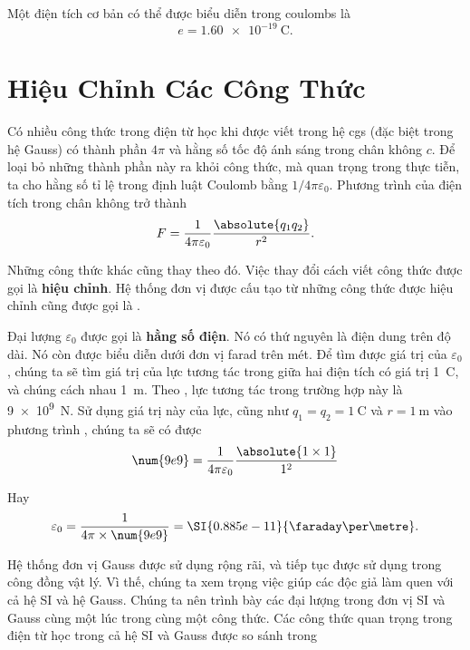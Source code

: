 Một điện tích cơ bản có thể được biểu diễn trong coulombs là
\begin{equation}\label{eq:1_10}
	e = \SI{1.60e-19}{\coulomb}.
\end{equation}

\section{Hiệu Chỉnh Các Công Thức}\label{sec:1_4}

Có nhiều công thức trong điện từ học khi được viết trong hệ cgs (đặc biệt trong hệ Gauss) có thành phần $4\pi$ và hằng số tốc độ ánh sáng trong chân không $c$. Để loại bỏ những thành phần này ra khỏi công thức, mà quan trọng trong thực tiễn, ta cho hằng số tỉ lệ trong định luật Coulomb bằng $1/4\pi\varepsilon_0$. Phương trình của điện tích trong chân không trở thành
\begin{equation}\label{eq:1_11}
	F = \frac{1}{4\pi\varepsilon_0}\frac{\absolute{q_1 q_2}}{r^2}.
\end{equation}

\noindent
Những công thức khác cũng thay theo đó. Việc thay đổi cách viết công thức được gọi là \textbf{hiệu chỉnh}. Hệ thống đơn vị được cấu tạo từ những công thức được hiệu chỉnh cũng được gọi là .

Đại lượng $\varepsilon_0$ được gọi là \textbf{hằng số điện}. Nó có thứ nguyên là điện dung trên độ dài. Nó còn được biểu diễn dưới đơn vị farad trên mét. Để tìm được giá trị của $\varepsilon_0$, chúng ta sẽ tìm giá trị của lực tương tác trong  giữa hai điện tích có giá trị \SI{1}{\coulomb}, và chúng cách nhau \SI{1}{\metre}. Theo , lực tương tác trong trường hợp này là \SI{9e9}{\newton}. Sử dụng giá trị này của lực, cũng như $q_1=q_2=\SI{1}{\coulomb}$ và $r=\SI{1}{\metre}$ vào phương trình , chúng ta sẽ có được
\begin{equation*}
	\num{9e9} = \frac{1}{4\pi\varepsilon_0}\frac{\absolute{1\times 1}}{1^2}
\end{equation*}

\noindent
Hay
\begin{equation}\label{eq:1_12}
	\varepsilon_0 = \frac{1}{4\pi\times\num{9e9}} = \SI{0.885e-11}{\faraday\per\metre}.
\end{equation}

Hệ thống đơn vị Gauss được sử dụng rộng rãi, và tiếp tục được sử dụng trong công đồng vật lý. Vì thế, chúng ta xem trọng việc giúp các độc giả làm quen với cả hệ SI và hệ Gauss. Chúng ta nên trình bày các đại lượng trong đơn vị SI và Gauss cùng một lúc trong cùng một công thức. Các công thức quan trọng trong điện từ học trong cả hệ SI và Gauss được so sánh trong 

